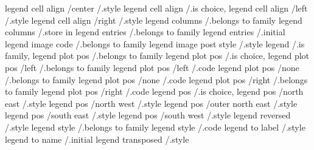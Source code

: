 legend cell align      /center            /.style
legend cell align                         /.is choice,       
legend cell align      /left              /.style
legend cell align      /right             /.style
legend columns                            /.belongs to family
legend columns                            /.store in         
legend entries                            /.belongs to family
legend entries                            /.initial          
legend image code                         /.belongs to family
legend image post style                   /.style            
legend                                    /.is family,       
legend plot pos                           /.belongs to family
legend plot pos                           /.is choice,       
legend plot pos        /left              /.belongs to family
legend plot pos        /left              /.code
legend plot pos        /none              /.belongs to family
legend plot pos        /none              /.code
legend plot pos        /right             /.belongs to family
legend plot pos        /right             /.code
legend pos                                /.is choice,       
legend pos             /north east        /.style
legend pos             /north west        /.style
legend pos             /outer north east  /.style
legend pos             /south east        /.style
legend pos             /south west        /.style
legend reversed                           /.style            
legend style                              /.belongs to family
legend style                              /.code             
legend to label                           /.style            
legend to name                            /.initial          
legend transposed                         /.style            

